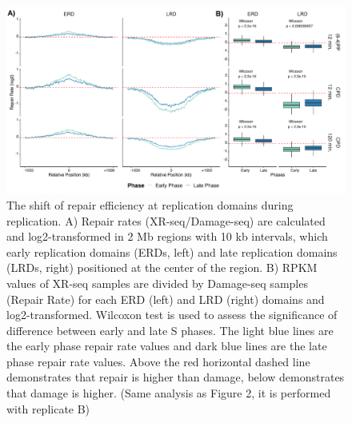 \begin{figure}[H]
\begin{center}
\includegraphics[width=\textwidth]{Chapters/7_appendix/figures/supfig10}
\caption[The shift of repair efficiency at replication domains during replication.]{The shift of repair efficiency at replication domains during replication. A) Repair rates (XR-seq/Damage-seq) are calculated and log2-transformed in 2 Mb regions with 10 kb intervals, which early replication domains (ERDs, left) and late replication domains (LRDs, right) positioned at the center of the region. B) RPKM values of XR-seq samples are divided by Damage-seq samples (Repair Rate) for each ERD (left) and LRD (right) domains and log2-transformed. Wilcoxon test is used to assess the significance of difference between early and late S phases. The light blue lines are the early phase repair rate values and dark blue lines are the late phase repair rate values. Above the red horizontal dashed line demonstrates that repair is higher than damage, below demonstrates that damage is higher. (Same analysis as Figure 2, it is performed with replicate B)}
\label{supfig:repdomain}
\end{center}
\end{figure}

